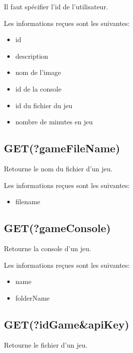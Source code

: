 \documentclass[a4paper,12pt,french]{sphinxmanual}
\begin{document}
\sphinxAtStartPar
Il faut spécifier l’id de l’utilisateur.

\sphinxAtStartPar
Les informations reçues sont les suivantes:
\begin{itemize}
\item {} 
\sphinxAtStartPar
id

\item {} 
\sphinxAtStartPar
description

\item {} 
\sphinxAtStartPar
nom de l’image

\item {} 
\sphinxAtStartPar
id de la console

\item {} 
\sphinxAtStartPar
id du fichier du jeu

\item {} 
\sphinxAtStartPar
nombre de minutes en jeu

\end{itemize}


\subsection{GET(?gameFileName)}
\label{\detokenize{fonctionnelle:get-gamefilename}}
\sphinxAtStartPar
Retourne le nom du fichier d’un jeu.

\sphinxAtStartPar
Les informations reçues sont les suivantes:
\begin{itemize}
\item {} 
\sphinxAtStartPar
filename

\end{itemize}


\subsection{GET(?gameConsole)}
\label{\detokenize{fonctionnelle:get-gameconsole}}
\sphinxAtStartPar
Retourne la console d’un jeu.

\sphinxAtStartPar
Les informations reçues sont les suivantes:
\begin{itemize}
\item {} 
\sphinxAtStartPar
name

\item {} 
\sphinxAtStartPar
folderName

\end{itemize}


\subsection{GET(?idGame\&apiKey)}
\label{\detokenize{fonctionnelle:get-idgame-apikey}}
\sphinxAtStartPar
Retourne le fichier d’un jeu.
\end{document}
